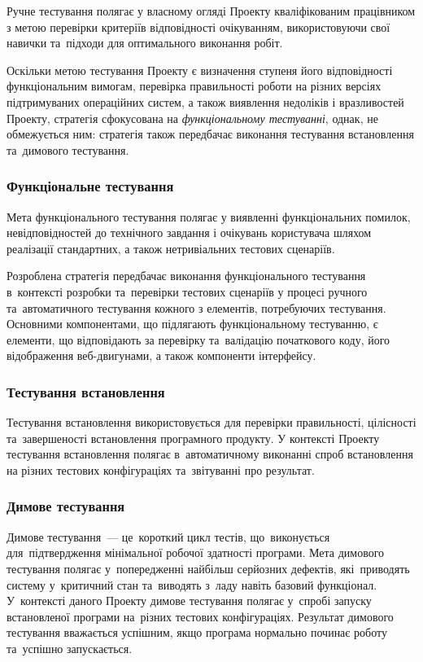 \documentclass[a4paper,oneside,BCOR=1cm,DIV=12,12pt,headings=normal]{scrartcl}
\begin{document}
			Ручне тестування полягає у власному огляді Проекту кваліфікованим працівником з метою перевірки критеріїв відповідності очікуванням, використовуючи свої навички та~підходи для оптимального виконання робіт.

			Оскільки метою тестування Проекту є визначення ступеня його відповідності функціональним вимогам, перевірка правильності роботи на різних версіях підтримуваних операційних систем, а також виявлення недоліків і вразливостей Проекту, стратегія сфокусована на \emph{функціональному тестуванні}, однак, не обмежується ним: стратегія також передбачає виконання тестування встановлення та~димового тестування.

			\subsubsection{Функціональне тестування}
				Мета функціонального тестування полягає у виявленні функціональних помилок, невідповідностей до технічного завдання і очікувань користувача шляхом реалізації стандартних, а також нетривіальних тестових сценаріїв.
				
				Розроблена стратегія передбачає виконання функціонального тестування в~контексті розробки та~перевірки тестових сценаріїв у процесі ручного та~автоматичного тестування кожного з елементів, потребуючих тестування. Основними компонентами, що підлягають функціональному тестуванню, є елементи, що відповідають за перевірку та~валідацію початкового коду, його відображення веб-двигунами, а також компоненти інтерфейсу.

			\subsubsection{Тестування встановлення}
				Тестування встановлення використовується для перевірки правильності, цілісності та~завершеності встановлення програмного продукту. У контексті Проекту тестування встановлення полягає в~автоматичному виконанні спроб встановлення на різних тестових конфігураціях та~звітуванні про результат.

			\subsubsection{Димове тестування}
				Димове тестування~— це~короткий цикл тестів, що~виконується для~підтвердження мінімальної робочої здатності програми. Мета димового тестування полягає у~попередженні найбільш серйозних дефектів, які~приводять систему у~критичний стан та~виводять з~ладу навіть базовий функціонал. У~контексті даного Проекту димове тестування полягає у~спробі запуску встановленої програми на~різних тестових конфігураціях. Результат димового тестування вважається успішним, якщо програма нормально починає роботу та~успішно запускається.
\end{document}
